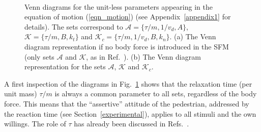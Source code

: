\documentclass[preprint,12pt]{elsarticle}
\begin{document}
\begin{figure}[!htbp]
\centering
 
\hfill    
{}\\
\caption[width=0.47\columnwidth]{Venn diagrams for the unit-less parameters
appearing in the equation of motion (\ref{eqn_motion}) (see 
Appendix~\ref{appendix1} for details). The sets correspond to 
$\mathcal{A}=\{\tau/m,1/v_d,A\}$, $\mathcal{K}=\{\tau/m,B,k_t\}$ and 
$\mathcal{K}_c=\{\tau/m,1/v_d,B,k_n\}$. (a) The Venn diagram representation if no 
body force is introduced in the SFM (only sets $\mathcal{A}$ and $\mathcal{K}$, 
as in Ref.~\cite{dorso_2019}). (b) The Venn diagram representation for the sets 
$\mathcal{A}$, $\mathcal{K}$ and $\mathcal{K}_c$. }
\label{venn_diagram}
\end{figure}

A first inspection of the diagrams in Fig.~\ref{venn_diagram} shows that the 
relaxation time (per unit mass) $\tau/m$ is always a common parameter to all 
sets, regardless of the body force. This means that the ``assertive'' attitude 
of the pedestrian, addressed by the reaction time (see 
Section~\ref{experimental}), applies to all stimuli and the own willings. The 
role of $\tau$ has already been discussed in 
Refs.~\cite{johansson_2009,dorso_2019}.    \\ 
\end{document}
